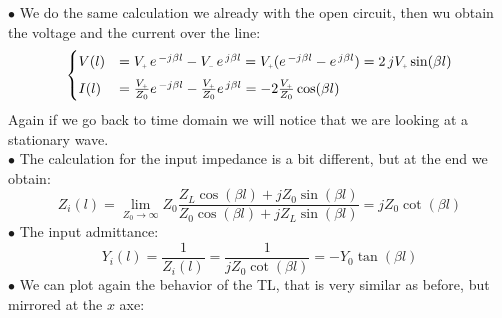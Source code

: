 $\bullet$ We do the same calculation we already with the open circuit, then wu obtain the voltage and the current over the line:
\begin{equation}
    \begin{cases}
      V(l)&=V\bottomPlus\,e^{\,-j\beta l}-V\bottomMinus\,e^{\,j\beta l}=V\bottomPlus(e^{\,-j\beta l}-e^{\,j\beta l})=2\,jV\bottomPlus\sin (\beta l)\\[5pt]
      I(l)&=\frac{V\bottomPlus}{Z_0}e^{\,-j\beta l}-\frac{V\bottomPlus}{Z_0}e^{\,j\beta l}=-2\frac{V\bottomPlus}{Z_0}\cos (\beta l)
    \end{cases}
\end{equation}
Again if we go back to time domain we will notice that we are looking at a stationary wave.\\
$\bullet$ The calculation for the input impedance is a bit different, but at the end we obtain:
\begin{equation}\label{eq:open_circuit_TL}
    Z_i(l)=\lim_{Z_0\rightarrow\infty} Z_0\frac{Z_L\cos(\beta l)+jZ_0 \sin(\beta l)}{Z_0\cos(\beta l)+jZ_L\sin(\beta l)}=jZ_0\cot(\beta l)
\end{equation}
$\bullet$ The input admittance:
\begin{equation}\label{input_admittance_of_a_short}
    Y_i(l)=\frac{1}{Z_i(l)}=\frac{1}{jZ_0\cot(\beta l)}=-Y_0\tan(\beta l)
\end{equation}
$\bullet$ We can plot again the behavior of the TL, that is very similar as before, but mirrored at the $x$ axe:
